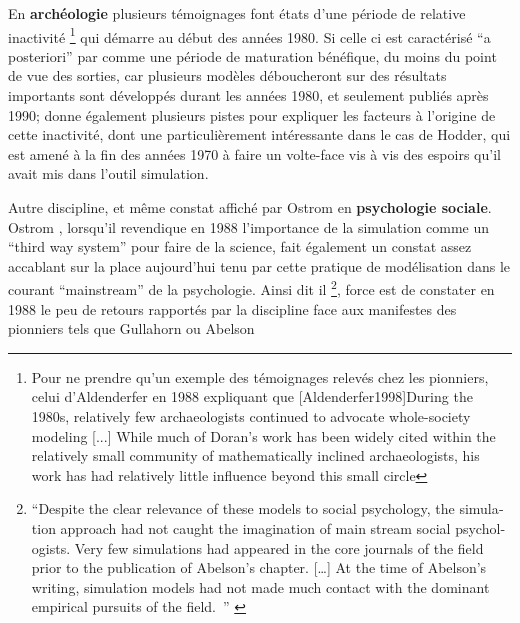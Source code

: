 {En \textbf{archéologie} plusieurs témoignages \autocite[6-7]{Lake2013} font états d'une période de relative inactivité \footnote{Pour ne prendre qu'un exemple des témoignages relevés chez les pionniers, celui d'Aldenderfer en 1988 expliquant que [Aldenderfer1998]{During the 1980s, relatively few archaeologists continued to advocate whole-society modeling [...] While much of Doran's work has been widely cited within the relatively small community of mathematically inclined archaeologists, his work has had relatively little influence beyond this small circle}} qui démarre au début des années 1980. Si celle ci est caractérisé \enquote{a posteriori} par \autocite{Lake2013} comme une période de maturation bénéfique, du moins du point de vue des sorties, car plusieurs modèles déboucheront sur des résultats importants sont développés durant les années 1980, et seulement publiés après 1990; \autocite{Lake2013} donne également plusieurs pistes pour expliquer les facteurs à l'origine de cette inactivité, dont une particulièrement intéressante dans le cas de Hodder, qui est amené à la fin des années 1970 à faire un volte-face vis à vis des espoirs qu'il avait mis dans l'outil simulation.

Autre discipline, et même constat affiché par Ostrom en \textbf{psychologie sociale}. Ostrom \autocite{Ostrom1988}, lorsqu'il revendique en 1988 l'importance de la simulation comme un \foreignquote{english}{third way system} pour faire de la science,  fait également un constat assez accablant sur la place aujourd'hui tenu par cette pratique de modélisation dans le courant \foreignquote{english}{mainstream} de la psychologie. Ainsi dit il \footnote{ \foreignquote{english}{Despite the clear relevance of these models to  social psychology, the simulation approach had not caught the imagination of main stream social psychologists. Very few simulations had appeared in the core journals of the field prior to the publication of Abelson's chapter. […] At the time of Abelson's writing, simulation models had not made much contact with the dominant empirical pursuits of the field. } \autocite[382]{Ostrom1988}}, force est de constater en 1988 le peu de retours rapportés par la discipline face aux manifestes des pionniers tels que Gullahorn \autocite{Gullahorn1965} ou Abelson \autocite{Abelson1968} 

}
